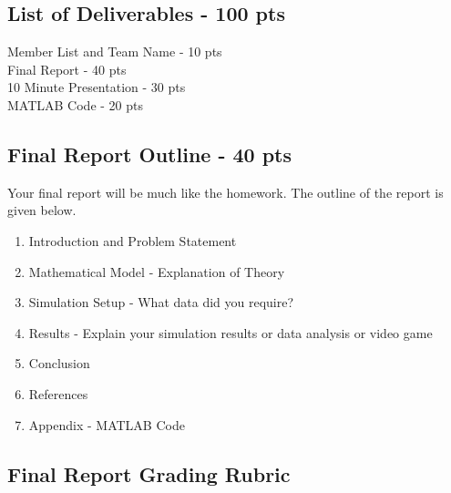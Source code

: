 \subsection{\bf List of Deliverables - 100 pts}

Member List and Team Name - 10 pts\\
Final Report - 40 pts\\
10 Minute Presentation - 30 pts\\
MATLAB Code - 20 pts

\subsection{\bf Final Report Outline - 40 pts}

Your final report will be much like the homework. The outline of the
report is given below.

\begin{enumerate}[I]
  \setlength\itemsep{-2pt}

  \item Introduction and Problem Statement

  \item Mathematical Model - Explanation of Theory

  \item Simulation Setup - What data did you require?

  \item Results - Explain your simulation results or data analysis or
    video game

  \item Conclusion

  \item References
   
  \item Appendix - MATLAB Code

\end{enumerate}

\subsection{Final Report Grading Rubric}

